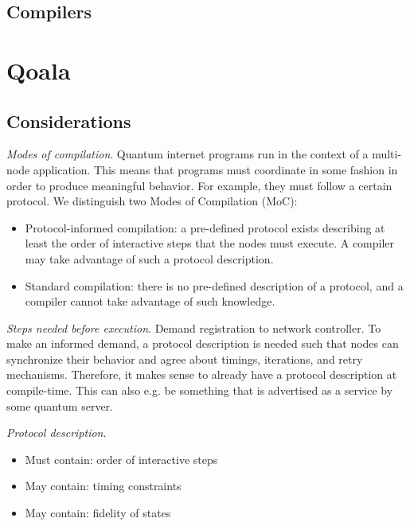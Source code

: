 \subsection{Compilers}

\section{Qoala}

\subsection{Considerations}

\textit{Modes of compilation}. Quantum internet programs run in the context of a multi-node application.
This means that programs must coordinate in some fashion in order to produce meaningful behavior.
For example, they must follow a certain protocol.
We distinguish two Modes of Compilation (MoC):
\begin{itemize}
    \item Protocol-informed compilation: a pre-defined protocol exists describing at least the order of interactive steps that the nodes must execute. A compiler may take advantage of such a protocol description.
    \item Standard compilation: there is no pre-defined description of a protocol, and a compiler cannot take advantage of such knowledge.
\end{itemize}

\textit{Steps needed before execution}.
Demand registration to network controller. To make an informed demand, a protocol description is needed such that nodes can synchronize their behavior and agree about timings, iterations, and retry mechanisms. Therefore, it makes sense to already have a protocol description at compile-time. This can also e.g. be something that is advertised as a service by some quantum server.

\textit{Protocol description}.
\begin{itemize}
    \item Must contain: order of interactive steps
    \item May contain: timing constraints
    \item May contain: fidelity of states
\end{itemize}


